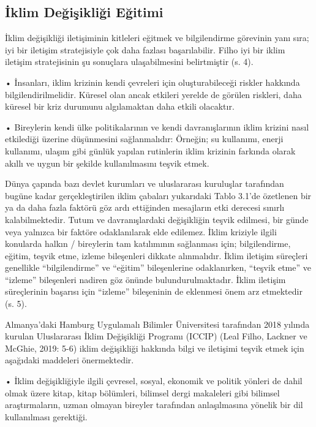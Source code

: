 \documentclass[
]{book}
\begin{document}
\hypertarget{iklim-deux11fiux15fikliux11fi-eux11fitimi}{%
\subsection{İklim Değişikliği Eğitimi}\label{iklim-deux11fiux15fikliux11fi-eux11fitimi}}

İklim değişikliği iletişiminin kitleleri eğitmek ve bilgilendirme görevinin yanı sıra; iyi bir iletişim stratejisiyle çok daha fazlası başarılabilir. Filho iyi bir iklim iletişim stratejisinin şu sonuçlara ulaşabilmesini belirtmiştir (s. 4). \citep{leal2019overview}

• İnsanları, iklim krizinin kendi çevreleri için oluşturabileceği riskler hakkında bilgilendirilmelidir. Küresel olan ancak etkileri yerelde de görülen riskleri, daha küresel bir kriz durumunu algılamaktan daha etkili olacaktır.

• Bireylerin kendi ülke politikalarının ve kendi davranışlarının iklim krizini nasıl etkilediği üzerine düşünmesini sağlanmalıdır: Örneğin; su kullanımı, enerji kullanımı, ulaşım gibi günlük yapılan rutinlerin iklim krizinin farkında olarak akıllı ve uygun bir şekilde kullanılmasını teşvik etmek.

Dünya çapında bazı devlet kurumları ve uluslararası kuruluşlar tarafından bugüne kadar gerçekleştirilen iklim çabaları yukarıdaki Tablo 3.1'de özetlenen bir ya da daha fazla faktörü göz ardı ettiğinden mesajların etki derecesi sınırlı kalabilmektedir. Tutum ve davranışlardaki değişikliğin teşvik edilmesi, bir günde veya yalnızca bir faktöre odaklanılarak elde edilemez. İklim kriziyle ilgili konularda halkın / bireylerin tam katılımının sağlanması için; bilgilendirme, eğitim, teşvik etme, izleme bileşenleri dikkate alınmalıdır. İklim iletişim süreçleri genellikle ``bilgilendirme'' ve ``eğitim'' bileşenlerine odaklanırken, ``teşvik etme'' ve ``izleme'' bileşenleri nadiren göz önünde bulundurulmaktadır. İklim iletişim süreçlerinin başarısı için ``izleme'' bileşeninin de eklenmesi önem arz etmektedir (s. 5). \citep{leal2019overview}

Almanya'daki Hamburg Uygulamalı Bilimler Üniversitesi tarafından 2018 yılında kurulan Uluslararası İklim Değişikliği Programı (ICCIP) (Leal Filho, Lackner ve McGhie, 2019: 5-6) iklim değişikliği hakkında bilgi ve iletişimi teşvik etmek için aşağıdaki maddeleri önermektedir.

• İklim değişikliğiyle ilgili çevresel, sosyal, ekonomik ve politik yönleri de dahil olmak üzere kitap, kitap bölümleri, bilimsel dergi makaleleri gibi bilimsel araştırmaların, uzman olmayan bireyler tarafından anlaşılmasına yönelik bir dil kullanılması gerektiği.
\end{document}
